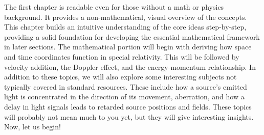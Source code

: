 The first chapter is readable even for those without a math or physics background. It provides a non-mathematical, visual overview of the concepts. This chapter builds an intuitive understanding of the core ideas step-by-step, providing a solid foundation for developing the essential mathematical framework in later sections. The mathematical portion will begin with deriving how space and time coordinates function in special relativity. This will be followed by velocity addition, the Doppler effect, and the energy-momentum relationship. In addition to these topics, we will also explore some interesting subjects not typically covered in standard resources. These include how a source’s emitted light is concentrated in the direction of its movement, aberration, and how a delay in light signals leads to retarded source positions and fields. These topics will probably not mean much to you yet, but they will give interesting insights.
\vspace{1cm} \newline
Now, let us begin!


\newpage